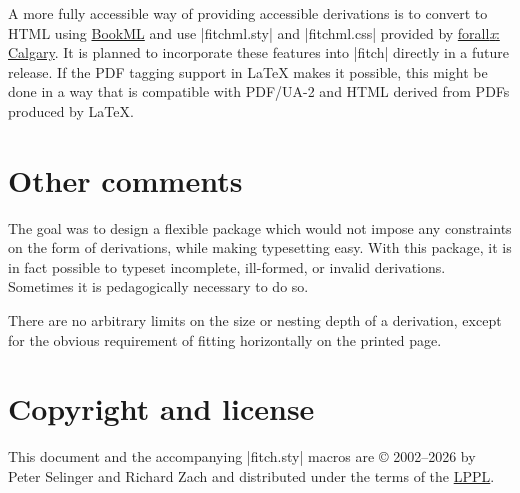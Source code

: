 \documentclass{ltxdoc}
\begin{document}
A more fully accessible way of providing accessible derivations is to
convert to HTML using
\href{https://vlmantova.github.io/bookml/}{BookML} and use
|fitchml.sty| and |fitchml.css| provided by
\href{https://github.com/rzach/forallx-yyc/}{forall\textit{x}:
Calgary}. It is planned to incorporate these features into |fitch|
directly in a future release. If the PDF tagging support in \LaTeX{}
makes it possible, this might be done in a way that is compatible with
PDF/UA-2 and HTML derived from PDFs produced by \LaTeX.

\section{Other comments}

The goal was to design a flexible package which would not impose any
constraints on the form of derivations, while making typesetting easy.
With this package, it is in fact possible to typeset incomplete,
ill-formed, or invalid derivations. Sometimes it is pedagogically necessary
to do so.

There are no arbitrary limits on the size or nesting depth of a derivation,
except for the obvious requirement of fitting horizontally on the
printed page.

\section{Copyright and license}

This document and the accompanying |fitch.sty| macros are {\copyright}
2002--2026 by Peter Selinger and Richard Zach and distributed under
the terms of the \href{https://www.latex-project.org/lppl/}{LPPL}.
\end{document}

